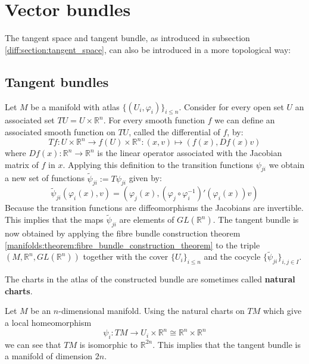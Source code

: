 \section{Vector bundles}
	The tangent space and tangent bundle, as introduced in subsection \ref{diff:section:tangent_space}, can also be introduced in a more topological way:
	
\subsection{Tangent bundles}

	\begin{construct}
		Let $M$ be a manifold with atlas $\{(U_i, \varphi_i)\}_{i\leq n}$. Consider for every open set $U$ an associated set $TU = U\times\mathbb{R}^n$. For every smooth function $f$ we can define an associated smooth function on $TU$, called the differential of $f$, by:
		\begin{equation}
			\label{diff:manifolds:T_function}
			Tf:U\times\mathbb{R}^n\rightarrow f(U)\times\mathbb{R}^n:(x, v)\mapsto(f(x), Df(x)v)
		\end{equation}
		where $Df(x):\mathbb{R}^n\rightarrow\mathbb{R}^n$ is the linear operator associated with the Jacobian matrix of $f$ in $x$. Applying this definition to the transition functions $\psi_{ji}$ we obtain a new set of functions $\widetilde{\psi}_{ji} := T\psi_{ji}$ given by:
		\begin{equation}
			\widetilde{\psi}_{ji}(\varphi_i(x), v) = \left(\varphi_j(x), (\varphi_j\circ\varphi_i^{-1})'(\varphi_i(x))v\right)
		\end{equation}
		Because the transition functions are diffeomorphisms the Jacobians are invertible. This implies that the maps $\widetilde\psi_{ji}$ are elements of $GL(\mathbb{R}^n)$. The tangent bundle is now obtained by applying the fibre bundle construction theorem \ref{manifolds:theorem:fibre_bundle_construction_theorem} to the triple $(M, \mathbb{R}^n, GL(\mathbb{R}^n))$ together with the cover $\{U_i\}_{i\leq n}$ and the cocycle $\{\widetilde\psi_{ji}\}_{i,j\in I}$.
	\end{construct}
	\begin{remark*}
		The charts in the atlas of the constructed bundle are sometimes called \textbf{natural charts}.
	\end{remark*}
	
	\begin{property}
		Let $M$ be an $n$-dimensional manifold. Using the natural charts on $TM$ which give a local homeomorphism \[\psi_i:TM\rightarrow U_i\times\mathbb{R}^n\cong\mathbb{R}^n\times\mathbb{R}^n\] we can see that $TM$ is isomorphic to $\mathbb{R}^{2n}$. This implies that the tangent bundle is a manifold of dimension $2n$.
	\end{property}
	
